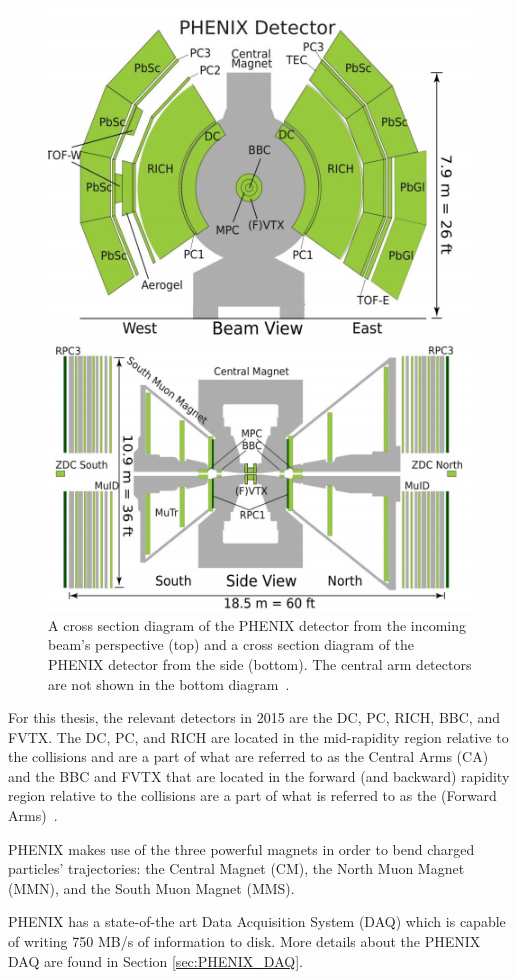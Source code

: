 \begin{figure}[!ht]
\centering
\includegraphics[width=0.55\linewidth]{figs/phenix_schematic.png}
\caption{A cross section diagram of the PHENIX detector from the incoming beam's perspective (top) and a cross section diagram of the PHENIX detector from the side (bottom). The central arm detectors are not shown in the bottom diagram~\cite{Aidala201444}.}
\label{fig:phenix_schematic}
\end{figure}

For this thesis, the relevant detectors in 2015 are the DC, PC, RICH, BBC, and FVTX. The DC, PC, and RICH are located in the mid-rapidity region relative to the collisions and are a part of  what are referred to as the Central Arms (CA) and the BBC and FVTX that are located in the forward (and backward) rapidity region relative to the collisions are a part of what is referred to as the (Forward Arms)~\cite{Adcox2003469}. 

PHENIX makes use of the three powerful magnets in order to bend charged particles' trajectories: the Central Magnet (CM), the North Muon Magnet (MMN), and the South Muon Magnet (MMS).

PHENIX has a state-of-the art Data Acquisition System (DAQ) which is capable of writing 750 MB/s of information to disk. More details about the PHENIX DAQ are found in Section \ref{sec:PHENIX_DAQ}.

